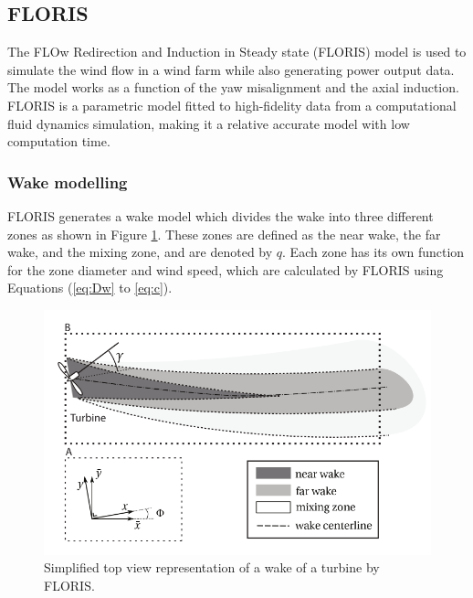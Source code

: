 
\subsection{FLORIS} The FLOw Redirection and Induction in Steady state (FLORIS) model is used to simulate the wind flow in a wind farm while also generating power output data. The model works as a function of the yaw misalignment and the axial induction\cite{Gebraad2016}. FLORIS is a parametric model fitted to high-fidelity data from a computational fluid dynamics simulation, making it a relative accurate model with low computation time\cite{Dijk2016}. 

\subsubsection{Wake modelling}
\label{wakemodel}
FLORIS generates a wake model which divides the wake into three different zones as shown in Figure \ref{fig:wake}. These zones are defined as the near wake, the far wake, and the mixing zone, and are denoted by $q$. Each zone has its own function for the zone diameter and wind speed, which are calculated by FLORIS using Equations (\ref{eq:Dw} to \ref{eq:c}). 


\begin{figure}
  	\includegraphics[width=\linewidth]{./Figures/WakeFLORIS.png}
  	\caption{Simplified top view representation of a wake of a turbine by FLORIS.\cite{Gebraad2016}   }
	\label{fig:wake}
\end{figure}

